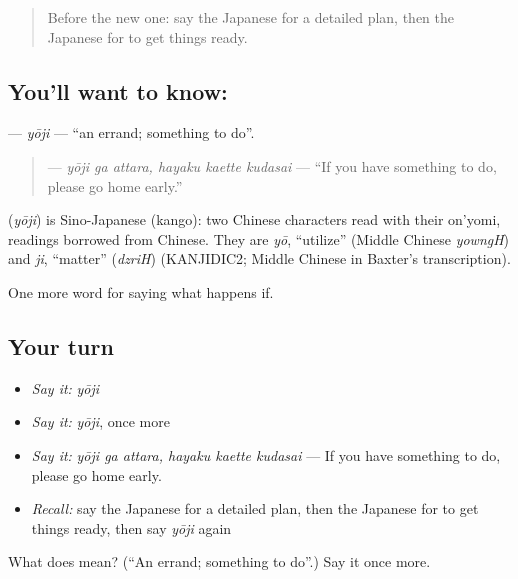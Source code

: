 \begin{quote}
Before the new one: say the Japanese for a detailed plan, then the Japanese for to get things ready.
\end{quote}

\subsection*{You'll want to know: }
\textbf{} — \emph{yōji} — \textquotedblleft{}an errand; something to do\textquotedblright{}.

\begin{quote}
\textbf{   } — \emph{yōji ga attara, hayaku kaette kudasai} — \textquotedblleft{}If you have something to do, please go home early.\textquotedblright{}
\end{quote}

\begin{cousinweb}
\textbf{} (\emph{yōji}) is Sino-Japanese (kango): two Chinese characters read with their on'yomi, readings borrowed from Chinese. They are \emph{yō}, \textquotedblleft{}utilize\textquotedblright{} (Middle Chinese \emph{yowngH}) and \emph{ji}, \textquotedblleft{}matter\textquotedblright{} (\emph{dzriH}) (KANJIDIC2; Middle Chinese in Baxter's transcription).
\end{cousinweb}

\begin{grammarlens}[title={What you've built}]
One more word for saying what happens if.
\end{grammarlens}

\subsection*{Your turn}
\begin{itemize}
\raggedright
  \item \emph{Say it:} \emph{yōji}
  \item \emph{Say it:} \emph{yōji}, once more
  \item \emph{Say it:} \emph{yōji ga attara, hayaku kaette kudasai} — If you have something to do, please go home early.
  \item \emph{Recall:} say the Japanese for a detailed plan, then the Japanese for to get things ready, then say \emph{yōji} again
\end{itemize}

\begin{tcolorbox}[breakable,colback=teal!4,colframe=teal!35!black,title={Before you move on}]
What does  mean? (\textquotedblleft{}An errand; something to do\textquotedblright{}.) Say it once more.
\end{tcolorbox}
